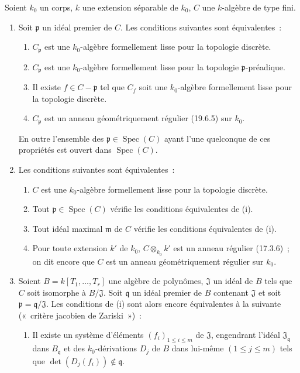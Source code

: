 \begin{proposition}[22.6.7]
\label{0.22.6.7-fr}
Soient $k_0$ un corps, $k$ une extension séparable de $k_0$, $C$ une
$k$-algèbre de type fini.
\begin{enumerate}
  \item[\rm(i)] Soit $\mathfrak p$ un idéal premier de $C$. Les conditions
  suivantes sont équivalentes~:
  \begin{enumerate}
    \item[a)] $C_{\mathfrak p}$ est une $k_0$-algèbre formellement lisse pour
    la topologie discrète.
    \item[b)] $C_{\mathfrak p}$ est une $k_0$-algèbre formellement lisse pour
    la topologie $\mathfrak p$-préadique.
    \item[c)] Il existe $f\in C-\mathfrak p$ tel que $C_f$ soit une
    $k_0$-algèbre formellement lisse pour la topologie discrète.
    \item[d)] $C_{\mathfrak p}$ est un anneau géométriquement régulier
    (19.6.5) sur $k_0$.
  \end{enumerate}
  En outre l'ensemble des $\mathfrak p\in\operatorname{Spec}(C)$ ayant l'une quelconque de
  ces propriétés est ouvert dans $\operatorname{Spec}(C)$.
  \item[\rm(ii)] Les conditions suivantes sont équivalentes~:
  \begin{enumerate}
    \item[a)] $C$ est une $k_0$-algèbre formellement lisse pour la topologie
    discrète.
    \item[b)] Tout $\mathfrak p\in\operatorname{Spec}(C)$ vérifie les conditions
    équivalentes de (i).
    \item[c)] Tout idéal maximal $\mathfrak m$ de $C$ vérifie les conditions
    équivalentes de (i).
    \item[d)] Pour toute extension $k'$ de $k_0$, $C\otimes_{k_0}k'$ est un
    anneau régulier (17.3.6)~; on dit encore que $C$ est un anneau
    géométriquement régulier sur $k_0$.
  \end{enumerate}


  \item[\rm(iii)] Soient $B=k[T_1,\ldots,T_r]$ une algèbre de polynômes,
  $\mathfrak J$ un idéal de $B$ tels que $C$ soit isomorphe à
  $B/\mathfrak J$. Soit $\mathfrak q$ un idéal premier de $B$ contenant
  $\mathfrak J$ et soit $\mathfrak p=\mathfrak q/\mathfrak J$. Les conditions
  de (i) sont alors encore équivalentes à la suivante («~critère jacobien de
  Zariski~»)~:
  \begin{enumerate}
    \item[e)] Il existe un système d'éléments
    $(f_i)_{1\leq i\leq m}$ de $\mathfrak J$, engendrant l'idéal
    $\mathfrak J_{\mathfrak q}$ dans $B_{\mathfrak q}$ et des
    $k_0$-dérivations $D_j$ de $B$ dans lui-même $(1\leq j\leq m)$ tels que
    $\det(D_j(f_i))\notin\mathfrak q$.
  \end{enumerate}
\end{enumerate}
\end{proposition}

